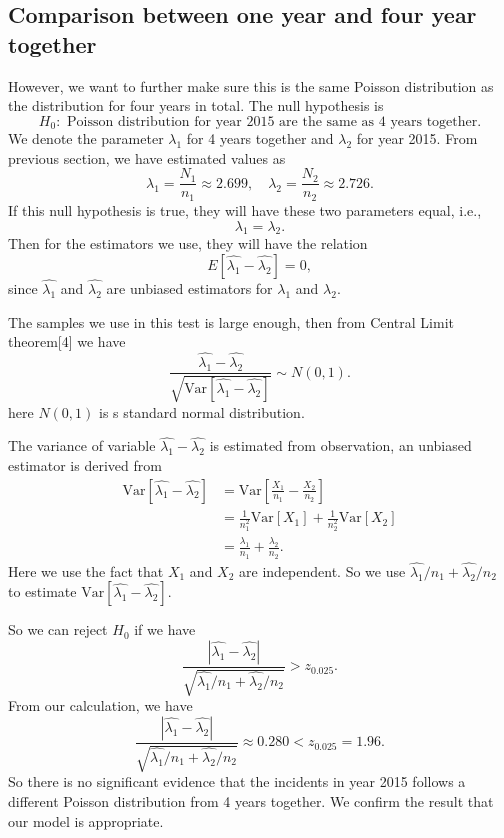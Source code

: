 \documentclass[11pt,a4paper,english]{article}
\begin{document}
\subsection{Comparison between one year and four year together}
However, we want to further make sure this is the same Poisson distribution as the distribution for four years in total. The null hypothesis is 
\[H_{0}:\text{ Poisson distribution for year 2015 are the same as 4 years together.}\]
We denote the parameter $\lambda_{1}$ for 4 years together and $\lambda_{2}$ for year 2015. From previous section, we have estimated values as
\[\lambda_{1} = \frac{N_{1}}{n_{1}} \approx 2.699,\quad \lambda_{2} = \frac{N_{2}}{n_{2}} \approx 2.726.\]
If this null hypothesis is true, they will have these two parameters equal, i.e.,
\begin{equation*}
	\lambda_{1} = \lambda_{2}.
\end{equation*}
Then for the estimators we use, they will have the relation
\begin{equation*}
	E[\hat{\lambda_{1}}-\hat{\lambda_{2}}] = 0,
\end{equation*}
since $\hat{\lambda_{1}}$ and $\hat{\lambda_{2}}$ are unbiased estimators for $\lambda_{1}$ and $\lambda_{2}$.

The samples we use in this test is large enough, then from Central Limit theorem[4] we have
\begin{equation*}
	\frac{\hat{\lambda_{1}} - \hat{\lambda_{2}}}{\sqrt{\text{Var}\left[\hat{\lambda_{1}} - \hat{\lambda_{2}}\right]}}
	\sim N(0, 1).
\end{equation*}
here $N(0,1)$ is s standard normal distribution.

The variance of variable $\hat{\lambda_{1}}-\hat{\lambda_{2}}$ is estimated from observation, an unbiased estimator is derived from
\begin{align*}
	\text{Var}\left[\hat{\lambda_{1}} - \hat{\lambda_{2}}\right]
	&= \text{Var}\left[\frac{X_{1}}{n_{1}} - \frac{X_{2}}{n_{2}}\right] \\
	&= \frac{1}{n_{1}^{2}}\text{Var}[X_{1}]
	+ \frac{1}{n_{2}^{2}}\text{Var}[X_{2}] \\
	&= \frac{\lambda_{1}}{n_{1}} + \frac{\lambda_{2}}{n_{2}}.
\end{align*}
Here we use the fact that $X_{1}$ and $X_{2}$ are independent. So we use $\hat{\lambda_{1}}/{n_{1}} + \hat{\lambda_{2}}/{n_{2}}$ to estimate $\text{Var}\left[\hat{\lambda_{1}}-\hat{\lambda_{2}}\right]$.

So we can reject $H_{0}$ if we have 
\[\frac{|\hat{\lambda_{1}}-\hat{\lambda_{2}}|}{\sqrt{\hat{\lambda_{1}}/{n_{1}} + \hat{\lambda_{2}}/{n_{2}}}} > z_{0.025}.\]
From our calculation, we have 
\begin{equation*}
	\frac{|\hat{\lambda_{1}}-\hat{\lambda_{2}}|}{\sqrt{\hat{\lambda_{1}}/{n_{1}} + \hat{\lambda_{2}}/{n_{2}}}} \approx 0.280 < z_{0.025} = 1.96.
\end{equation*}
So there is no significant evidence that the incidents in year 2015 follows a different Poisson distribution from 4 years together. We confirm the result that our model is appropriate.
\end{document}
